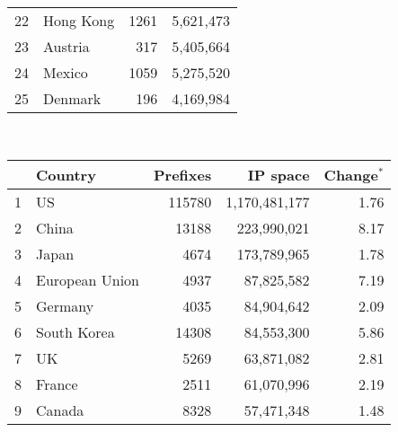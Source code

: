 \begin{table*}[tp]
\begin{minipage}[t]{0.48\textwidth}
\begin{center}
\begin{tabular}{|l||l|r|r|}
22      &       Hong Kong       &       1261    &       5,621,473       \tabularnewline %
23      &       Austria 		&       317     &       5,405,664       \tabularnewline %
24      &       Mexico  		&       1059    &       5,275,520       \tabularnewline %
25      &       Denmark 		&       196     &       4,169,984       \tabularnewline %
	\hline
	\end{tabular}
	\end{center}
	\ \newline\ \newline
\end{minipage}
%
\quad
%
\begin{minipage}[t]{0.48\textwidth}
	\begin{center}
	\caption{Top 25 countries with the most number of announced IP space in BGP table on \textbf{April 23, 2009}}
	\label{tab:top25 bgp ip space 2009}
	\begin{tabular}{|l||l|r|r|r|}
		\hline
		&      \bf Country		& \bf Prefixes  &       \bf IP space 	& \bf Change$^{*}$ 	\tabularnewline \hline 
1       &       US      		&       115780  &       1,170,481,177   & 1.76			\tabularnewline %
2       &       China   		&       13188   &       223,990,021     & 8.17			\tabularnewline %
3       &       Japan   		&       4674    &       173,789,965     & 1.78			\tabularnewline %
4       &       European Union  &       4937    &       87,825,582      & 7.19			\tabularnewline %
5       &       Germany 		&       4035    &       84,904,642      & 2.09			\tabularnewline %
6       &       South Korea     &       14308   &       84,553,300      & 5.86			\tabularnewline %
7       &       UK      		&       5269    &       63,871,082      & 2.81			\tabularnewline %
8       &       France  		&       2511    &       61,070,996      & 2.19			\tabularnewline %
9       &       Canada  		&       8328    &       57,471,348      & 1.48			\tabularnewline %

\end{tabular}
\end{center}
\end{minipage}
\end{table*}
